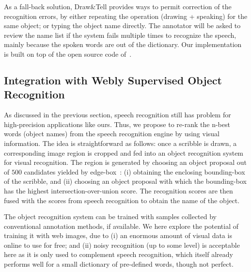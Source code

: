 \documentclass[runningheads]{llncs}
\begin{document}

As a fall-back solution, Draw\&Tell provides ways to permit correction of the recognition errors, by either repeating the operation (drawing + speaking) for the same object;
or typing the object name directly.  The annotator will be asked to
review the name list if the system fails multiple times to recognize
the speech, mainly because the spoken words are out of the dictionary.  
Our implementation is built on top of the open source code of~\citep{lexfree2015}. 



\subsection{Integration with Webly Supervised Object Recognition}
\label{sec:web}
As discussed in the previous section, speech recognition still has problem for high-precision applications like ours. Thus, we propose to re-rank the n-best words (object names) from the speech recognition engine by using visual information. The idea is straightforward as follows: once a scribble is drawn, a corresponding image region is cropped and fed into an object recognition system for visual recognition. The region is generated by choosing an object proposal out of $500$ candidates yielded by edge-box~\citep{edge:box}: (i) obtaining the enclosing bounding-box of the scribble, and (ii) choosing an object proposal with which the bounding-box has the highest intersection-over-union score. 
The recognition scores are then fused with the scores from speech recognition to obtain the name of the object.  %

The object recognition system can be trained with samples collected by conventional annotation methods, if available. We here explore the potential of training it with web images, due to (i) an enormous amount of visual data is online to use for free; and (ii) noisy  recognition (up to some level) is acceptable here as it is only used to complement speech recognition, which itself already performs well for a small dictionary of pre-defined words, though not perfect. 
\end{document}
